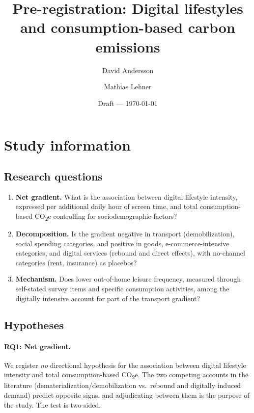 \documentclass[11pt,a4paper]{article}
\title{Pre-registration: Digital lifestyles and consumption-based carbon
emissions}
\author{David Andersson \and Mathias Lehner}
\date{Draft --- \today}
\begin{document}
\maketitle

\section{Study information}

\subsection{Research questions}
\begin{enumerate}
  \item \textbf{Net gradient.} What is the association between digital lifestyle
    intensity, expressed per
    additional daily hour of screen time, and total consumption-based CO\textsubscript{2}e controlling for sociodemographic factors?
  \item \textbf{Decomposition.} Is the gradient negative in transport  (demobilization), social spending categories, 
   and positive in goods, e-commerce-intensive categories,
    and digital services (rebound and direct effects), with no-channel categories (rent, insurance) as placebos?
  \item \textbf{Mechanism.} Does lower out-of-home leisure frequency, measured through self-stated survey items and specific consumption activities, among the digitally intensive account for part of the transport gradient?
\end{enumerate}

\subsection{Hypotheses}

\paragraph{RQ1: Net gradient.} We register \emph{no} directional hypothesis for
the association between digital lifestyle intensity and total consumption-based
CO\textsubscript{2}e. The two competing accounts in the literature
(dematerialization/demobilization vs.\ rebound and digitally induced demand)
predict opposite signs, and adjudicating between them is the purpose of the
study. The test is two-sided.
\end{document}
